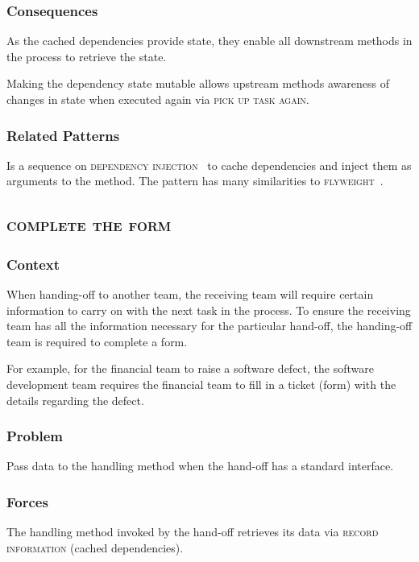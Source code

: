 \documentclass[prodmode]{style/acmlarge}
\begin{document}
\subsubsection*{Consequences} As the cached dependencies provide state, they
enable all downstream methods in the process to retrieve the state.

Making the dependency state mutable allows upstream methods awareness of changes
in state when executed again via \textsc{pick up task again}.

\subsubsection*{Related Patterns} Is a sequence on \textsc{dependency
injection}~\cite{ioc} to cache dependencies and inject them as arguments to the
method.  The pattern has many similarities to \textsc{flyweight}~\cite{gof}.



\subsection{\textsc{\textbf{complete the form}}}

\subsubsection*{Context} When handing-off to another team, the receiving team
will require certain information to carry on with the next task in the process.  To
ensure the receiving team has all the information necessary for the particular
hand-off, the handing-off team is required to complete a form.

For example, for the financial team to raise a software defect, the software
development team requires the financial team to fill in a ticket (form) with the
details regarding the defect.

\subsubsection*{Problem} Pass data to the handling method when the hand-off has
a standard interface.

\subsubsection*{Forces} The handling method invoked by the hand-off retrieves
its data via \textsc{record information} (cached dependencies).
\end{document}
